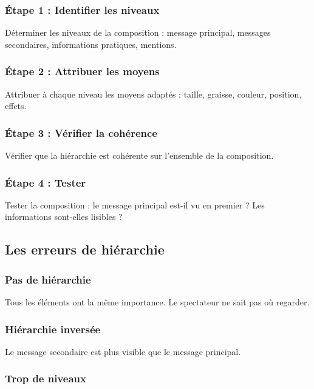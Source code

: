\subsubsection{Étape 1 : Identifier les niveaux}

Déterminer les niveaux de la composition : message principal, messages secondaires, informations pratiques, mentions.

\subsubsection{Étape 2 : Attribuer les moyens}

Attribuer à chaque niveau les moyens adaptés : taille, graisse, couleur, position, effets.

\subsubsection{Étape 3 : Vérifier la cohérence}

Vérifier que la hiérarchie est cohérente sur l'ensemble de la composition.

\subsubsection{Étape 4 : Tester}

Tester la composition : le message principal est-il vu en premier ? Les informations sont-elles lisibles ?

\subsection{Les erreurs de hiérarchie}

\subsubsection{Pas de hiérarchie}

Tous les éléments ont la même importance. Le spectateur ne sait pas où regarder.

\subsubsection{Hiérarchie inversée}

Le message secondaire est plus visible que le message principal.

\subsubsection{Trop de niveaux}

